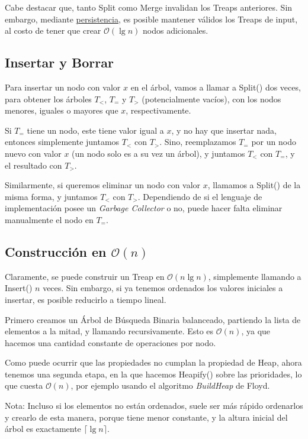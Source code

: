 Cabe destacar que, tanto Split como Merge invalidan los Treaps anteriores. 
Sin embargo, mediante \hyperref[sec:persistencia]{persistencia}, es posible mantener válidos los Treaps de input, al costo de tener que crear \(\mathcal{O}(\lg n)\) nodos adicionales.

\subsection{Insertar y Borrar}

Para insertar un nodo con valor \(x\) en el árbol, vamos a llamar a Split() dos veces,
para obtener los árboles \(T_<\), \(T_=\) y \(T_>\) (potencialmente vacíos), 
con los nodos menores, iguales o mayores que \(x\), respectivamente.

Si \(T_=\) tiene un nodo, este tiene valor igual a \(x\), y no hay que insertar nada, entonces simplemente juntamos \(T_<\) con \(T_>\).
Sino, reemplazamos \(T_=\) por un nodo nuevo con valor \(x\) (un nodo solo es a su vez un árbol),
y juntamos \(T_<\) con \(T_=\), y el resultado con \(T_>\).

Similarmente, si queremos eliminar un nodo con valor \(x\), llamamos a Split() de la misma forma,
y juntamos \(T_<\) con \(T_>\). 
Dependiendo de si el lenguaje de implementación posee un \textit{Garbage Collector} o no, puede hacer falta eliminar manualmente el nodo en \(T_=\).

\subsection[Construcción en O(n)]{Construcción en \(\mathcal{O}(n)\)}

Claramente, se puede construir un Treap en \(\mathcal{O}(n \lg n)\), 
simplemente llamando a Insert() \(n\) veces.
Sin embargo, si ya tenemos ordenados los valores iniciales a insertar, es posible reducirlo a tiempo lineal.

Primero creamos un Árbol de Búsqueda Binaria balanceado, partiendo la lista de elementos a la mitad, y llamando recursivamente. Esto es \(\mathcal{O}(n)\), ya que hacemos una cantidad constante de operaciones por nodo.

Como puede ocurrir que las propiedades no cumplan la propiedad de Heap, ahora tenemos una segunda etapa, en la que hacemos Heapify() sobre las prioridades, lo que cuesta \(\mathcal{O}(n)\), 
por ejemplo usando el algoritmo \textit{BuildHeap} de Floyd.

Nota: Incluso si los elementos no están ordenados, suele ser más rápido ordenarlos y crearlo de esta manera, porque tiene menor constante, y la altura inicial del árbol es exactamente \(\lceil \lg n \rceil\).
